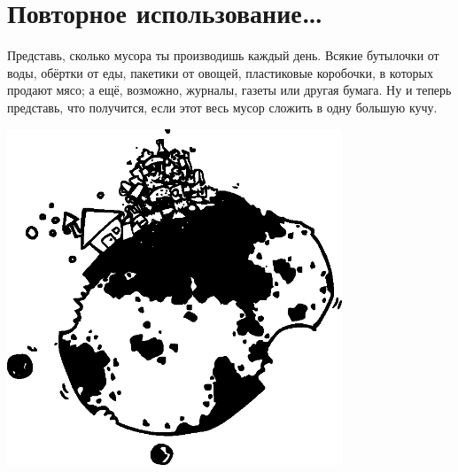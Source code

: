 %
%
%

\chapter{Повторное использование…}\label{ch:sortoflikerecycling}

Представь, сколько мусора ты производишь каждый день. Всякие бутылочки от воды, обёртки от еды, пакетики от овощей, пластиковые коробочки, в которых продают мясо; а ещё, возможно, журналы, газеты или другая бумага. Ну и теперь представь, что получится, если этот весь мусор сложить в одну большую кучу.

\begin{center}
\includegraphics*[width=100mm]{../en/trash.eps}
\end{center}


